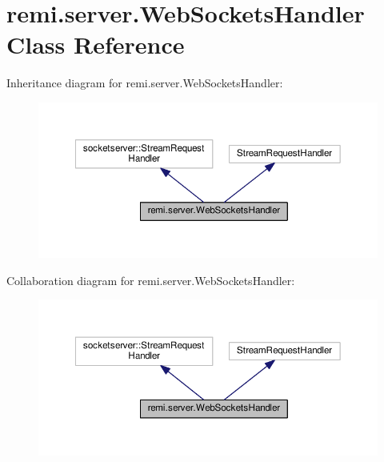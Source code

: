 \hypertarget{classremi_1_1server_1_1WebSocketsHandler}{}\section{remi.\+server.\+Web\+Sockets\+Handler Class Reference}
\label{classremi_1_1server_1_1WebSocketsHandler}


Inheritance diagram for remi.\+server.\+Web\+Sockets\+Handler\+:
\nopagebreak
\begin{figure}[H]
\begin{center}
\leavevmode
\includegraphics[width=350pt]{d0/d4f/classremi_1_1server_1_1WebSocketsHandler__inherit__graph}
\end{center}
\end{figure}


Collaboration diagram for remi.\+server.\+Web\+Sockets\+Handler\+:
\nopagebreak
\begin{figure}[H]
\begin{center}
\leavevmode
\includegraphics[width=350pt]{d5/d3f/classremi_1_1server_1_1WebSocketsHandler__coll__graph}
\end{center}
\end{figure}
